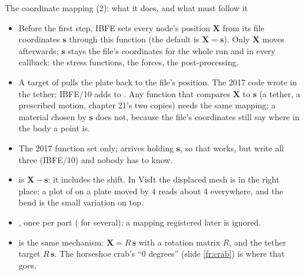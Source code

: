 \documentclass[aspectratio=169,11pt]{beamer}
\begin{document}
\begin{frame}{The coordinate mapping (2): what it does, and what must follow it}
\label{fr:mapping2}
\footnotesize
\begin{itemize}
  \item {} Before the first step, IBFE sets every node's position $\mathbf{X}$ from its file coordinates $\mathbf{s}$ through this function (the default is $\mathbf{X} = \mathbf{s}$). Only $\mathbf{X}$ moves afterwards; $\mathbf{s}$ stays the file's coordinates for the whole run and in every callback: the stress functions, the forces, the post-processing.
  \item {} A target of  pulls the plate back to the file's position. The 2017 code wrote  in the tether; IBFE/10 adds  to . Any function that compares $\mathbf{X}$ to $\mathbf{s}$ (a tether, a prescribed motion, chapter 21's two copies) needs the same mapping; a material chosen by $\mathbf{s}$ does not, because the file's coordinates still say where in the body a point is.
  \item {} The 2017 function set  only;  arrives holding $\mathbf{s}$, so that works, but write all three (IBFE/10) and nobody has to know.
  \item {} is $\mathbf{X} - \mathbf{s}$: it includes the shift. In VisIt the displaced mesh is in the right place; a plot of  on a plate moved by $4$ reads about $4$ everywhere, and the bend is the small variation on top.
  \item {} , once per part ( for several); a mapping registered later is ignored.
  \item {} is the same mechanism: $\mathbf{X} = R\,\mathbf{s}$ with a rotation matrix $R$, and the tether target $R\,\mathbf{s}$. The horseshoe crab's ``$0$ degrees'' (slide \ref{fr:crab}) is where that goes.
\end{itemize}
\end{frame}
\end{document}

